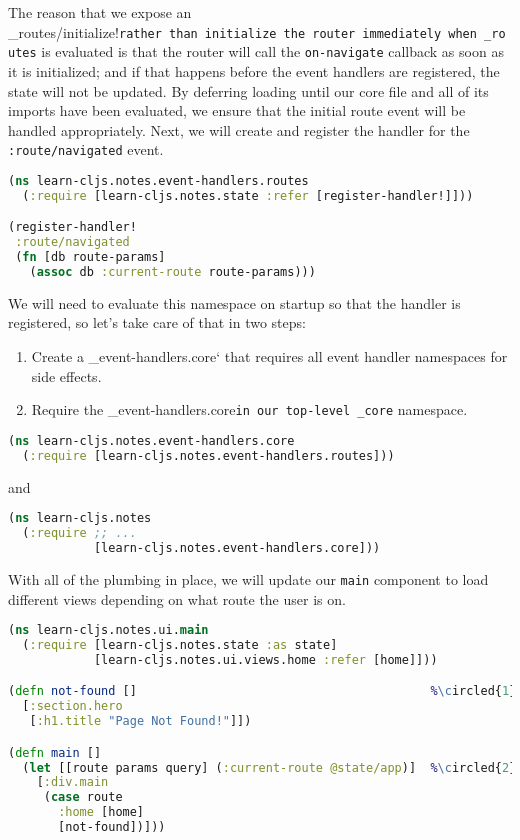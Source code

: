 \documentclass[10pt,twoside,openright]{memoir}
\newcommand*\circled[1]{\tikz[baseline=(char.base)]{
            \node[shape=circle,draw,inner sep=1pt] (char) {#1};}}
\begin{document}
The reason that we expose an
\_routes/initialize!\texttt{rather\ than\ initialize\ the\ router\ immediately\ when\ \_routes}
is evaluated is that the router will call the \texttt{on-navigate}
callback as soon as it is initialized; and if that happens before the
event handlers are registered, the state will not be updated. By
deferring loading until our core file and all of its imports have been
evaluated, we ensure that the initial route event will be handled
appropriately. Next, we will create and register the handler for the
\texttt{:route/navigated} event.

\begin{lstlisting}[language=Clojure, caption={notes/event\_handlers/routes.cljs}]
(ns learn-cljs.notes.event-handlers.routes
  (:require [learn-cljs.notes.state :refer [register-handler!]]))

(register-handler!
 :route/navigated
 (fn [db route-params]
   (assoc db :current-route route-params)))
\end{lstlisting}

We will need to evaluate this namespace on startup so that the handler
is registered, so let's take care of that in two steps:

\begin{enumerate}
\def\labelenumi{\arabic{enumi}.}
\tightlist
\item
  Create a \_event-handlers.core` that requires all event handler
  namespaces for side effects.
\item
  Require the \_event-handlers.core\texttt{in\ our\ top-level\ \_core}
  namespace.
\end{enumerate}

\begin{lstlisting}[language=Clojure, caption={notes/event\_handlers/core.cljs}]
(ns learn-cljs.notes.event-handlers.core
  (:require [learn-cljs.notes.event-handlers.routes]))
\end{lstlisting}

and

\begin{lstlisting}[language=Clojure, caption={notes.cljs}]
(ns learn-cljs.notes
  (:require ;; ...
            [learn-cljs.notes.event-handlers.core]))
\end{lstlisting}

With all of the plumbing in place, we will update our \texttt{main}
component to load different views depending on what route the user is
on.

\begin{lstlisting}[language=Clojure, caption={notes/ui/main.cljs}]
(ns learn-cljs.notes.ui.main
  (:require [learn-cljs.notes.state :as state]
            [learn-cljs.notes.ui.views.home :refer [home]]))

(defn not-found []                                         %\circled{1}%
  [:section.hero
   [:h1.title "Page Not Found!"]])

(defn main []
  (let [[route params query] (:current-route @state/app)]  %\circled{2}%
    [:div.main
     (case route
       :home [home]
       [not-found])]))
\end{lstlisting}
\end{document}
